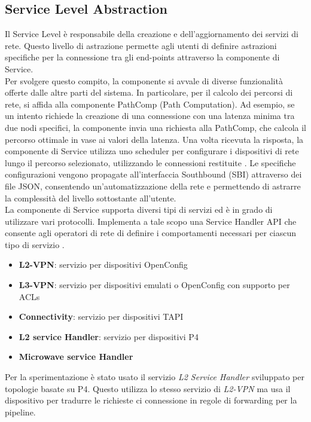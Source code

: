 \subsection{Service Level Abstraction}
Il Service Level è responsabile della creazione e dell'aggiornamento dei servizi di rete.
Questo livello di astrazione permette agli utenti di definire astrazioni specifiche per la connessione tra gli end-points attraverso la componente di Service.
\\Per svolgere questo compito, la componente si avvale di diverse funzionalità offerte dalle altre parti del sistema.
In particolare, per il calcolo dei percorsi di rete, si affida alla componente PathComp (Path Computation).
Ad esempio, se un intento richiede la creazione di una connessione con una latenza minima tra due nodi specifici, 
la componente invia una richiesta alla PathComp, che calcola il percorso ottimale in vase ai valori della latenza.
Una volta ricevuta la risposta, la componente di Service utilizza uno scheduler per configurare i dispositivi di rete lungo il percorso selezionato, utilizzando le connessioni restituite \cite{D32}. %
Le specifiche configurazioni vengono propagate all'interfaccia Southbound (SBI) attraverso dei file JSON, consentendo un'automatizzazione della rete e permettendo di astrarre la complessità del livello sottostante all'utente.
\\La componente di Service supporta diversi tipi di servizi ed è in grado di utilizzare vari protocolli.
Implementa a tale scopo una Service Handler API che consente agli operatori di rete di definire i comportamenti necessari per ciascun tipo di servizio \cite{D32}.
\begin{itemize}
    \item \textbf{L2-VPN}: servizio per dispositivi OpenConfig
    \item \textbf{L3-VPN}: servizio per dispositivi emulati o OpenConfig con supporto per ACLs
    \item \textbf{Connectivity}: servizio per dispositivi TAPI
    \item \textbf{L2 service Handler}: servizio per dispositivi P4
    \item \textbf{Microwave service Handler}
\end{itemize}
Per la sperimentazione è stato usato il servizio \textit{L2 Service Handler} sviluppato per topologie basate su P4.
Questo utilizza lo stesso servizio di \textit{L2-VPN} ma usa il dispositivo per tradurre le richieste ci connessione in regole di forwarding per la pipeline.
